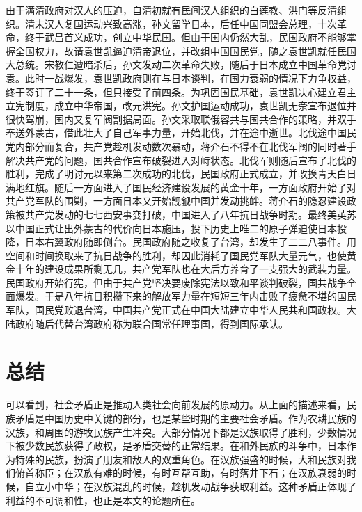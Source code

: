 由于满清政府对汉人的压迫，自清初就有民间汉人组织的白莲教、洪门等反清组织。清末汉人复国运动兴致高涨，孙文留学日本，后任中国同盟会总理，十次革命，终于武昌首义成功，创立中华民国。但由于国内仍然大乱，民国政府不能够掌握全国权力，故请袁世凯逼迫清帝退位，并改组中国国民党，随之袁世凯就任民国大总统。宋教仁遭暗杀后，孙文发动二次革命失败，随后于日本成立中国革命党讨袁。此时一战爆发，袁世凯政府则在与日本谈判，在国力衰弱的情况下力争权益，终于签订了二十一条，但只接受了前四条。为巩固国民基础，袁世凯决心建立君主立宪制度，成立中华帝国，改元洪宪。孙文护国运动成功，袁世凯无奈宣布退位并很快驾崩，国内又复军阀割据局面。孙文采取联俄容共与国共合作的策略，并双手奉送外蒙古，借此壮大了自己军事力量，开始北伐，并在途中逝世。北伐途中国民党内部分而复合，共产党趁机发动数次暴动，蒋介石不得不在北伐军阀的同时著手解决共产党的问题，国共合作宣布破裂进入对峙状态。北伐军则随后宣布了北伐的胜利，完成了明讨元以来第二次成功的北伐，民国政府正式成立，并改换青天白日满地红旗。随后一方面进入了国民经济建设发展的黄金十年，一方面政府开始了对共产党军队的围剿，一方面日本又开始觊觎中国并发动挑衅。蒋介石的隐忍建设政策被共产党发动的七七西安事变打破，中国进入了八年抗日战争时期。最终美英苏以中国正式让出外蒙古的代价向日本施压，投下历史上唯二的原子弹迫使日本投降，日本右翼政府随即倒台。民国政府随之收复了台湾，却发生了二二八事件。用空间和时间换取来了抗日战争的胜利，却因此消耗了国民党军队大量元气，也使黄金十年的建设成果所剩无几，共产党军队也在大后方养育了一支强大的武装力量。民国政府开始行宪，但由于共产党坚决要废除宪法以致和平谈判破裂，国共战争全面爆发。于是八年抗日积攒下来的解放军力量在短短三年内击败了疲惫不堪的国民军队，国民党败退台湾，中国共产党正式在中国大陆建立中华人民共和国政权。大陆政府随后代替台湾政府称为联合国常任理事国，得到国际承认。

\section{总结}

可以看到，社会矛盾正是推动人类社会向前发展的原动力。从上面的描述来看，民族矛盾是中国历史中关键的部分，也是某些时期的主要社会矛盾。作为农耕民族的汉族，和周围的游牧民族产生冲突。大部分情况下都是汉族取得了胜利，少数情况下被少数民族获得了政权，是矛盾交替的正常结果。在和外民族的斗争中，日本作为特殊的民族，扮演了朋友和敌人的双重角色。在汉族强盛的时候，大和民族对我们俯首称臣；在汉族有难的时候，有时互帮互助，有时落井下石；在汉族衰弱的时候，自立小中华；在汉族混乱的时候，趁机发动战争获取利益。这种矛盾正体现了利益的不可调和性，也正是本文的论题所在。